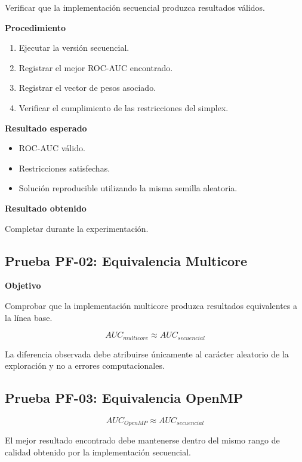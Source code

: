 Verificar que la implementación secuencial produzca resultados válidos.

\textbf{Procedimiento}

\begin{enumerate}
    \item Ejecutar la versión secuencial.
    \item Registrar el mejor ROC-AUC encontrado.
    \item Registrar el vector de pesos asociado.
    \item Verificar el cumplimiento de las restricciones del simplex.
\end{enumerate}

\textbf{Resultado esperado}

\begin{itemize}
    \item ROC-AUC válido.
    \item Restricciones satisfechas.
    \item Solución reproducible utilizando la misma semilla aleatoria.
\end{itemize}

\textbf{Resultado obtenido}

Completar durante la experimentación.


\subsection{Prueba PF-02: Equivalencia Multicore}

\textbf{Objetivo}

Comprobar que la implementación multicore produzca resultados equivalentes a la línea base.

\[
AUC_{multicore}\approx AUC_{secuencial}
\]

La diferencia observada debe atribuirse únicamente al carácter aleatorio de la exploración y no a errores computacionales.


\subsection{Prueba PF-03: Equivalencia OpenMP}

\[
AUC_{OpenMP}\approx AUC_{secuencial}
\]

El mejor resultado encontrado debe mantenerse dentro del mismo rango de calidad obtenido por la implementación secuencial.

